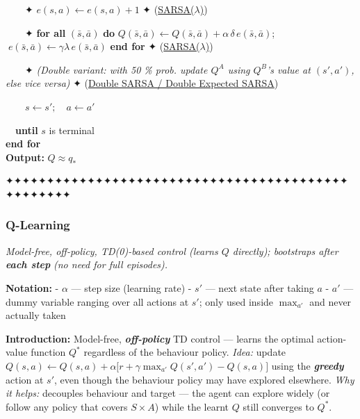 \documentclass[11pt]{article}
\begin{document}
\begin{pseudobox}
\strut ~~~~✦ \(e(s,a) \leftarrow e(s,a) + 1\) ✦
(\hyperref[trick-2-4-2]{SARSA(\(\lambda\))})\\
\strut ~~~~✦ \textbf{for all} \((\bar s,\bar a)\) \textbf{do}
\(Q(\bar s,\bar a) \leftarrow Q(\bar s,\bar a) + \alpha\,\delta\,e(\bar s,\bar a)\);
\(\;e(\bar s,\bar a) \leftarrow \gamma\lambda\,e(\bar s,\bar a)\)
\textbf{end for} ✦ (\hyperref[trick-2-4-2]{SARSA(\(\lambda\))})\\
\strut ~~~~✦ \emph{(Double variant: with 50 \% prob. update \(Q^A\)
using \(Q^B\)'s value at \((s',a')\), else vice versa)} ✦
(\hyperref[trick-2-4-5]{Double SARSA / Double Expected SARSA})\\
\strut ~~~~\(s \leftarrow s';\quad a \leftarrow a'\)\\
\strut ~~\textbf{until} \(s\) is terminal\\
\textbf{end for}\\
\textbf{Output:} \(Q \approx q_{*}\)

\end{pseudobox}

    ✦✦✦✦✦✦✦✦✦✦✦✦✦✦✦✦✦✦✦✦✦✦✦✦✦✦✦✦✦✦✦✦✦✦✦✦✦✦✦✦✦✦✦✦✦✦✦✦✦✦

    \clearpage

\label{q-learning-algo}

    \subsubsection{Q-Learning}\label{q-learning}

    \emph{Model-free, off-policy, TD(0)-based control (learns \(Q\)
directly); bootstraps after} \textbf{\emph{each step}} \emph{(no need
for full episodes).}

    \textbf{Notation:} - \(\alpha\) --- step size (learning rate) - \(s'\)
--- next state after taking \(a\) - \(a'\) --- dummy variable ranging
over all actions at \(s'\); only used inside \(\max_{a'}\) and never
actually taken

    \label{intro-2-5}

    \textbf{Introduction:} Model-free, \textbf{\emph{off-policy}} TD control
--- learns the optimal action-value function \(Q^*\) regardless of the
behaviour policy. \emph{Idea:} update
\(Q(s,a) \leftarrow Q(s,a) + \alpha\bigl[r + \gamma \max_{a'} Q(s', a') - Q(s,a)\bigr]\)
using the \textbf{\emph{greedy}} action at \(s'\), even though the
behaviour policy may have explored elsewhere. \emph{Why it helps:}
decouples behaviour and target --- the agent can explore widely (or
follow any policy that covers \(S\times A\)) while the learnt \(Q\)
still converges to \(Q^*\).
\end{document}
